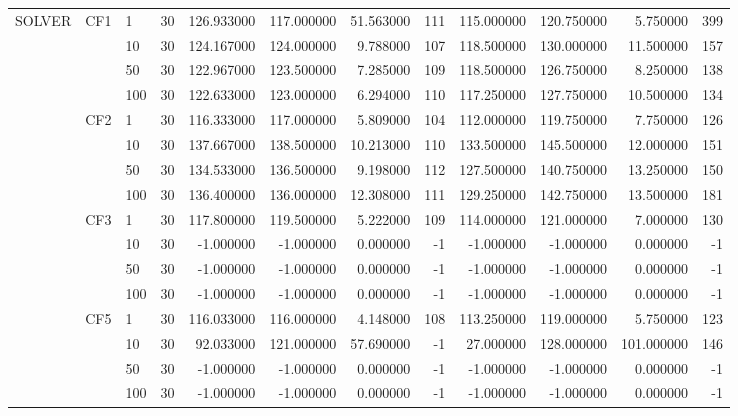 \begin{tabular}{lllrrrrrrrrr}
\cline{1-12} \cline{2-12}
\multirow[t]{16}{*}{SOLVER} & \multirow[t]{4}{*}{CF1} & 1 & 30 & 126.933000 & 117.000000 & 51.563000 & 111 & 115.000000 & 120.750000 & 5.750000 & 399 \\
 &  & 10 & 30 & 124.167000 & 124.000000 & 9.788000 & 107 & 118.500000 & 130.000000 & 11.500000 & 157 \\
 &  & 50 & 30 & 122.967000 & 123.500000 & 7.285000 & 109 & 118.500000 & 126.750000 & 8.250000 & 138 \\
 &  & 100 & 30 & 122.633000 & 123.000000 & 6.294000 & 110 & 117.250000 & 127.750000 & 10.500000 & 134 \\
\cline{2-12}
 & \multirow[t]{4}{*}{CF2} & 1 & 30 & 116.333000 & 117.000000 & 5.809000 & 104 & 112.000000 & 119.750000 & 7.750000 & 126 \\
 &  & 10 & 30 & 137.667000 & 138.500000 & 10.213000 & 110 & 133.500000 & 145.500000 & 12.000000 & 151 \\
 &  & 50 & 30 & 134.533000 & 136.500000 & 9.198000 & 112 & 127.500000 & 140.750000 & 13.250000 & 150 \\
 &  & 100 & 30 & 136.400000 & 136.000000 & 12.308000 & 111 & 129.250000 & 142.750000 & 13.500000 & 181 \\
\cline{2-12}
 & \multirow[t]{4}{*}{CF3} & 1 & 30 & 117.800000 & 119.500000 & 5.222000 & 109 & 114.000000 & 121.000000 & 7.000000 & 130 \\
 &  & 10 & 30 & -1.000000 & -1.000000 & 0.000000 & -1 & -1.000000 & -1.000000 & 0.000000 & -1 \\
 &  & 50 & 30 & -1.000000 & -1.000000 & 0.000000 & -1 & -1.000000 & -1.000000 & 0.000000 & -1 \\
 &  & 100 & 30 & -1.000000 & -1.000000 & 0.000000 & -1 & -1.000000 & -1.000000 & 0.000000 & -1 \\
\cline{2-12}
 & \multirow[t]{4}{*}{CF5} & 1 & 30 & 116.033000 & 116.000000 & 4.148000 & 108 & 113.250000 & 119.000000 & 5.750000 & 123 \\
 &  & 10 & 30 & 92.033000 & 121.000000 & 57.690000 & -1 & 27.000000 & 128.000000 & 101.000000 & 146 \\
 &  & 50 & 30 & -1.000000 & -1.000000 & 0.000000 & -1 & -1.000000 & -1.000000 & 0.000000 & -1 \\
 &  & 100 & 30 & -1.000000 & -1.000000 & 0.000000 & -1 & -1.000000 & -1.000000 & 0.000000 & -1 \\
\cline{1-12} \cline{2-12}
\bottomrule
\end{tabular}

